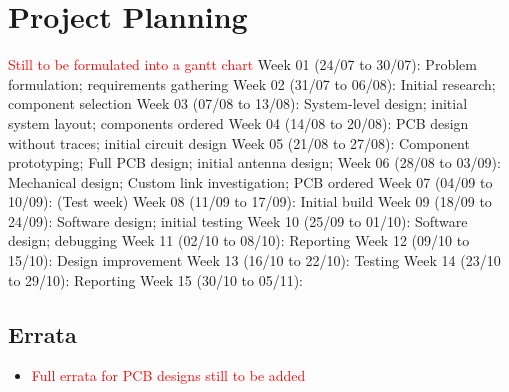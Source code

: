 \graphicspath{{./figures}}

\chapter{Project Planning}
\textcolor{red}{Still to be formulated into a gantt chart}
Week 01 (24/07 to 30/07): Problem formulation; requirements gathering
Week 02 (31/07 to 06/08): Initial research; component selection
Week 03 (07/08 to 13/08): System-level design; initial system layout; components ordered
Week 04 (14/08 to 20/08): PCB design without traces; initial circuit design
Week 05 (21/08 to 27/08): Component prototyping; Full PCB design; initial antenna design;
Week 06 (28/08 to 03/09): Mechanical design; Custom link investigation; PCB ordered
Week 07 (04/09 to 10/09): (Test week)
Week 08 (11/09 to 17/09): Initial build
Week 09 (18/09 to 24/09): Software design; initial testing
Week 10 (25/09 to 01/10): Software design; debugging
Week 11 (02/10 to 08/10): Reporting
Week 12 (09/10 to 15/10): Design improvement
Week 13 (16/10 to 22/10): Testing
Week 14 (23/10 to 29/10): Reporting
Week 15 (30/10 to 05/11):



\section{Errata}\label{sec:appendix_pcb_errata}
\begin{itemize}
    \item \textcolor{red}{Full errata for PCB designs still to be added}
\end{itemize}





